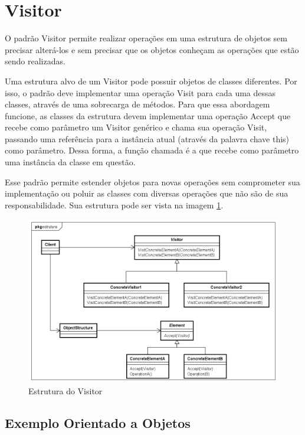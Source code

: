 \section{Visitor}

O padrão Visitor permite realizar 
operações em uma estrutura de objetos sem precisar alterá-los 
e sem precisar que os objetos conheçam as 
operações que estão sendo realizadas. 

Uma estrutura alvo de um Visitor pode possuir objetos de 
classes diferentes. Por isso, o padrão deve implementar 
uma operação Visit para cada uma dessas classes, 
através de uma sobrecarga de métodos. Para que essa 
abordagem funcione, as classes da estrutura devem implementar 
uma operação Accept que recebe como parâmetro um 
Visitor genérico e chama sua operação Visit, 
passando uma referência para a instância atual 
(através da palavra chave this) 
como parâmetro. Dessa forma, a função chamada é a 
que recebe como parâmetro uma instância da 
classe em questão.

Esse padrão permite estender objetos para novas operações 
sem comprometer sua implementação ou poluir as classes com 
diversas operações que não são de sua responsabilidade. 
Sua estrutura pode ser vista na imagem \ref{visitor_struct}.

\begin{figure}[htb]
	\caption{\label{visitor_struct}Estrutura do Visitor}
	\begin{center}
	    \includegraphics[scale=0.5]{5_padroes-contexto-funcional/5.3_comportamentais/5.3.11_visitor/visitor_estrutura.png}
	\end{center}
\end{figure}

\subsection*{Exemplo Orientado a Objetos}

